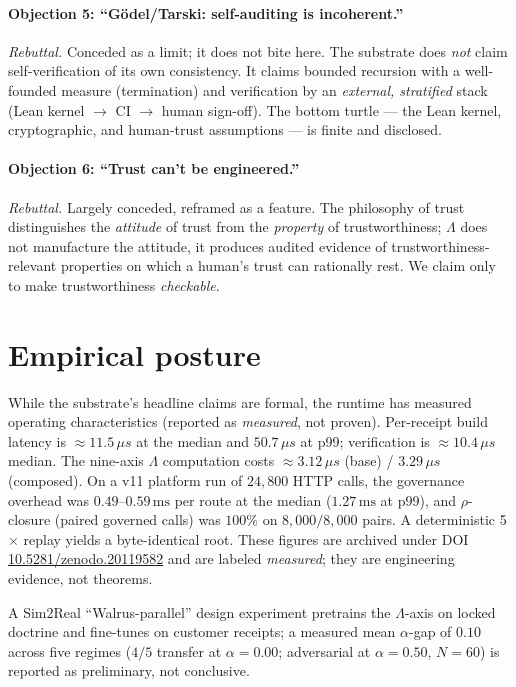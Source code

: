 \documentclass[11pt]{article}
\theoremstyle{plain}
\theoremstyle{definition}
\theoremstyle{remark}
\newcommand{\La}{\Lambda}
\begin{document}
\paragraph{Objection 5: ``G\"odel/Tarski: self-auditing is incoherent.''}
\emph{Rebuttal.} Conceded as a limit; it does not bite here. The substrate does
\emph{not} claim self-verification of its own consistency. It claims bounded
recursion with a well-founded measure (termination) and verification by an
\emph{external, stratified} stack (Lean kernel $\to$ CI $\to$ human sign-off). The
bottom turtle --- the Lean kernel, cryptographic, and human-trust assumptions --- is
finite and disclosed.

\paragraph{Objection 6: ``Trust can't be engineered.''}
\emph{Rebuttal.} Largely conceded, reframed as a feature. The philosophy of trust
distinguishes the \emph{attitude} of trust from the \emph{property} of
trustworthiness; $\La$ does not manufacture the attitude, it produces audited
evidence of trustworthiness-relevant properties on which a human's trust can
rationally rest. We claim only to make trustworthiness \emph{checkable}.

\section{Empirical posture}
\label{sec:empirical}

While the substrate's headline claims are formal, the runtime has measured
operating characteristics (reported as \emph{measured}, not proven). Per-receipt
build latency is $\approx 11.5\,\mu s$ at the median and $50.7\,\mu s$ at p99;
verification is $\approx 10.4\,\mu s$ median. The nine-axis $\La$ computation costs
$\approx 3.12\,\mu s$ (base) / $3.29\,\mu s$ (composed). On a v11 platform run of
$24{,}800$ HTTP calls, the governance overhead was $0.49$--$0.59\,\mathrm{ms}$ per
route at the median ($1.27\,\mathrm{ms}$ at p99), and $\rho$-closure (paired
governed calls) was $100\%$ on $8{,}000/8{,}000$ pairs. A deterministic 5$\times$
replay yields a byte-identical root. These figures are archived under DOI
\href{https://doi.org/10.5281/zenodo.20119582}{10.5281/zenodo.20119582} and are
labeled \emph{measured}; they are engineering evidence, not theorems.

A Sim2Real ``Walrus-parallel'' design experiment pretrains the $\La$-axis on locked
doctrine and fine-tunes on customer receipts; a measured mean $\alpha$-gap of $0.10$
across five regimes ($4/5$ transfer at $\alpha=0.00$; adversarial at $\alpha=0.50$,
$N=60$) is reported as preliminary, not conclusive.
\end{document}
